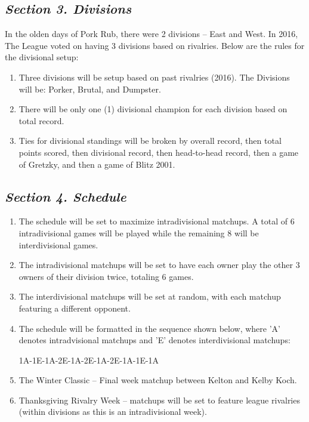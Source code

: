 \documentclass{article}
\begin{document}
    \subsection{\textit{Section 3. Divisions}}
    In the olden days of Pork Rub, there were 2 divisions – East and West. In 2016, The League voted on having 3 divisions based on rivalries. Below are the rules for the divisional setup:
    \begin{enumerate}[label=\Alph*)]
        \item Three divisions will be setup based on past rivalries (2016). The Divisions will be: Porker, Brutal, and Dumpster.
        \item There will be only one (1) divisional champion for each division based on total record.
        \item Ties for divisional standings will be broken by overall record, then total points scored, then divisional record, then head-to-head record, then a game of Gretzky, and then a game of Blitz 2001.
    \end{enumerate}
    \subsection{\textit{Section 4. Schedule}}
    \begin{enumerate}[label=\Alph*)]
        \item The schedule will be set to maximize intradivisional matchups. A total of 6 intradivisional games will be played while the remaining 8 will be interdivisional games.
        \item The intradivisional matchups will be set to have each owner play the other 3 owners of their division twice, totaling 6 games.
        \item The interdivisional matchups will be set at random, with each matchup featuring a different opponent.
        \item The schedule will be formatted in the sequence shown below, where 'A' denotes intradvisional matchups and 'E' denotes interdivisional matchups:
        \begin{center}\textsc{1A-1E-1A-2E-1A-2E-1A-2E-1A-1E-1A}\end{center}
        \item The Winter Classic – Final week matchup between Kelton and Kelby Koch.
        \item Thanksgiving Rivalry Week – matchups will be set to feature league rivalries (within divisions as this is an intradivisional week).
    \end{enumerate}
\end{document}
